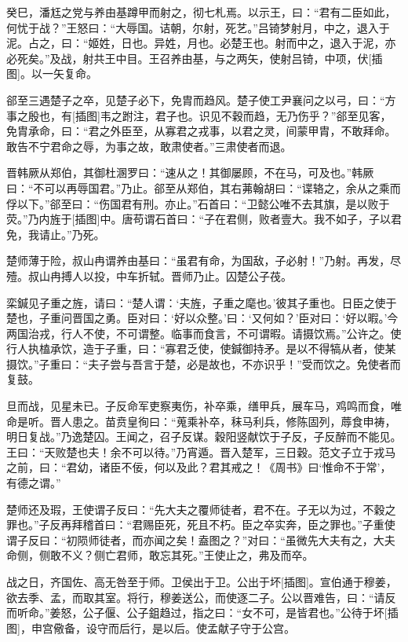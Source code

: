 \documentclass[a4paper,12pt,UTF8,twoside]{ctexbook}
\begin{document}
癸巳，潘尪之党与养由基蹲甲而射之，彻七札焉。以示王，曰：“君有二臣如此，何忧于战？”王怒曰：“大辱国。诘朝，尔射，死艺。”吕锜梦射月，中之，退入于泥。占之，曰：“姬姓，日也。异姓，月也。必楚王也。射而中之，退入于泥，亦必死矣。”及战，射共王中目。王召养由基，与之两矢，使射吕锜，中项，伏[插图]。以一矢复命。

郤至三遇楚子之卒，见楚子必下，免胄而趋风。楚子使工尹襄问之以弓，曰：“方事之殷也，有[插图]韦之跗注，君子也。识见不穀而趋，无乃伤乎？”郤至见客，免胄承命，曰：“君之外臣至，从寡君之戎事，以君之灵，间蒙甲胄，不敢拜命。敢告不宁君命之辱，为事之故，敢肃使者。”三肃使者而退。

晋韩厥从郑伯，其御杜溷罗曰：“速从之！其御屡顾，不在马，可及也。”韩厥曰：“不可以再辱国君。”乃止。郤至从郑伯，其右茀翰胡曰：“谍辂之，余从之乘而俘以下。”郤至曰：“伤国君有刑。亦止。”石首曰：“卫懿公唯不去其旗，是以败于荧。”乃内旌于[插图]中。唐苟谓石首曰：“子在君侧，败者壹大。我不如子，子以君免，我请止。”乃死。

楚师薄于险，叔山冉谓养由基曰：“虽君有命，为国敌，子必射！”乃射。再发，尽殪。叔山冉搏人以投，中车折轼。晋师乃止。囚楚公子茷。

栾鍼见子重之旌，请曰：“楚人谓：‘夫旌，子重之麾也。’彼其子重也。日臣之使于楚也，子重问晋国之勇。臣对曰：‘好以众整。’曰：‘又何如？’臣对曰：‘好以暇。’今两国治戎，行人不使，不可谓整。临事而食言，不可谓暇。请摄饮焉。”公许之。使行人执榼承饮，造于子重，曰：“寡君乏使，使鍼御持矛。是以不得犒从者，使某摄饮。”子重曰：“夫子尝与吾言于楚，必是故也，不亦识乎！”受而饮之。免使者而复鼓。

旦而战，见星未已。子反命军吏察夷伤，补卒乘，缮甲兵，展车马，鸡鸣而食，唯命是听。晋人患之。苗贲皇徇曰：“蒐乘补卒，秣马利兵，修陈固列，蓐食申祷，明日复战。”乃逸楚囚。王闻之，召子反谋。穀阳竖献饮于子反，子反醉而不能见。王曰：“天败楚也夫！余不可以待。”乃宵遁。晋入楚军，三日穀。范文子立于戎马之前，曰：“君幼，诸臣不佞，何以及此？君其戒之！《周书》曰‘惟命不于常’，有德之谓。”

楚师还及瑕，王使谓子反曰：“先大夫之覆师徒者，君不在。子无以为过，不穀之罪也。”子反再拜稽首曰：“君赐臣死，死且不朽。臣之卒实奔，臣之罪也。”子重使谓子反曰：“初陨师徒者，而亦闻之矣！盍图之？”对曰：“虽微先大夫有之，大夫命侧，侧敢不义？侧亡君师，敢忘其死。”王使止之，弗及而卒。

战之日，齐国佐、高无咎至于师。卫侯出于卫。公出于坏[插图]。宣伯通于穆姜，欲去季、孟，而取其室。将行，穆姜送公，而使逐二子。公以晋难告，曰：“请反而听命。”姜怒，公子偃、公子鉏趋过，指之曰：“女不可，是皆君也。”公待于坏[插图]，申宫儆备，设守而后行，是以后。使孟献子守于公宫。
\end{document}
